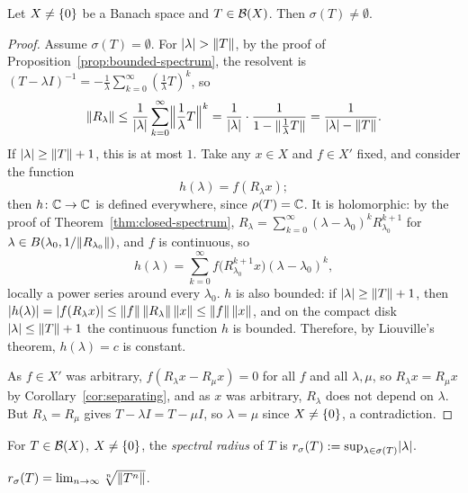 \begin{theorem}\label{thm:spectrum-nonempty}
Let $X \ne \{0\}$ be a Banach space and $T \in \mathcal{B}(X)$. Then
$\sigma(T) \ne \emptyset$.
\end{theorem}

\begin{proof}
Assume $\sigma(T) = \emptyset$. For $\lvert\lambda\rvert > \lVert T\rVert$, by the proof
of Proposition~\ref{prop:bounded-spectrum}, the resolvent is
$(T - \lambda I)^{-1} = -\frac{1}{\lambda} \sum_{k=0}^{\infty}
(\frac{1}{\lambda} T)^k$, so
\[
  \lVert R_\lambda\rVert
  \le \frac{1}{\lvert\lambda\rvert} \sum_{k=0}^{\infty}
      \Bigl\lVert \frac{1}{\lambda} T \Bigr\rVert^k
  = \frac{1}{\lvert\lambda\rvert} \cdot
    \frac{1}{1 - \lVert\frac{1}{\lambda} T\rVert}
  = \frac{1}{\lvert\lambda\rvert - \lVert T\rVert} .
\]
If $\lvert\lambda\rvert \ge \lVert T\rVert + 1$, this is at most $1$. Take any $x \in X$
and $f \in X'$ fixed, and consider the function
\[
  h(\lambda) = f(R_\lambda x) ;
\]
then $h \colon \mathbb{C} \to \mathbb{C}$ is defined everywhere, since $\rho(T) = \mathbb{C}$. It is
holomorphic: by the proof of Theorem~\ref{thm:closed-spectrum},
$R_\lambda = \sum_{k=0}^{\infty} (\lambda - \lambda_0)^k R_{\lambda_0}^{k+1}$
for $\lambda \in B(\lambda_0, 1/\lVert R_{\lambda_0}\rVert)$, and $f$ is continuous,
so
\[
  h(\lambda) = \sum_{k=0}^{\infty} f\bigl(R_{\lambda_0}^{k+1} x\bigr)
  (\lambda - \lambda_0)^k ,
\]
locally a power series around every $\lambda_0$. $h$ is also bounded: if
$\lvert\lambda\rvert \ge \lVert T\rVert + 1$, then
$\lvert h(\lambda)\rvert = \lvert f(R_\lambda x)\rvert \le \lVert f\rVert\,\lVert R_\lambda\rVert\,
\lVert x\rVert \le \lVert f\rVert\,\lVert x\rVert$, and on the compact disk
$\lvert\lambda\rvert \le \lVert T\rVert + 1$ the continuous function $h$ is bounded.
Therefore, by Liouville's theorem, $h(\lambda) = c$ is constant.

As $f \in X'$ was arbitrary, $f(R_\lambda x - R_\mu x) = 0$ for all $f$ and
all $\lambda, \mu$, so $R_\lambda x = R_\mu x$ by
Corollary~\ref{cor:separating}, and as $x$ was arbitrary, $R_\lambda$ does
not depend on $\lambda$. But $R_\lambda = R_\mu$ gives
$T - \lambda I = T - \mu I$, so $\lambda = \mu$ since $X \ne \{0\}$, a
contradiction.
\end{proof}

\begin{definition}\label{def:spectral-radius}
For $T \in \mathcal{B}(X)$, $X \ne \{0\}$, the \emph{spectral radius} of $T$ is
$r_\sigma(T) := \sup_{\lambda \in \sigma(T)} \lvert\lambda\rvert$.
\end{definition}

\begin{theorem}\label{thm:gelfand}
$r_\sigma(T) = \lim_{n \to \infty} \sqrt[n]{\lVert T^n\rVert}$.
\end{theorem}

